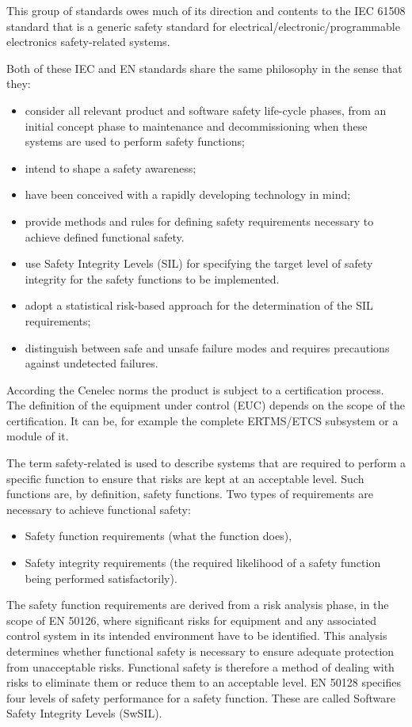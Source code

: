 This group of standards owes much of its direction and contents to the IEC 61508 standard that is a generic safety standard for electrical/electronic/programmable electronics safety-related systems.

Both of these IEC and EN standards share the same philosophy in the sense that they:

\begin{itemize}
\item consider all relevant product and software safety life-cycle phases, from an initial concept phase to maintenance and decommissioning when these systems are used to perform safety functions;
\item intend to shape a safety awareness; \item have been conceived with a rapidly developing technology in mind;
\item provide methods and rules for defining safety requirements necessary to achieve defined functional safety.
\item use Safety Integrity Levels (SIL) for specifying the target level of safety integrity for the safety functions to be implemented.
\item adopt a statistical risk-based approach for the determination of the SIL requirements;
\item distinguish between safe and unsafe failure modes and requires precautions against undetected failures. 
\end{itemize}

According the Cenelec norms the product is subject to a certification process. The definition of the equipment under control (EUC) depends on the scope of the certification. It can be, for example the complete ERTMS/ETCS subsystem or a  module of it.

The term safety-related is used to describe systems that are required to perform a specific function to ensure that risks are kept at an acceptable level. Such functions are, by definition, safety functions. Two types of requirements are necessary to achieve functional safety: 

\begin{itemize}
\item Safety function requirements (what the function does),
\item Safety integrity requirements (the required likelihood of a safety function being performed satisfactorily).
\end{itemize}

The safety function requirements are derived from a risk analysis phase, in the scope of EN 50126, where significant risks for equipment and any associated control system in its intended environment have to be identified. This analysis determines whether functional safety is necessary to ensure adequate protection from unacceptable risks. Functional safety is therefore
a method of dealing with risks to eliminate them or reduce them to an acceptable level. EN 50128 specifies four levels of safety
performance for a safety function. These are called Software Safety Integrity Levels (SwSIL).

